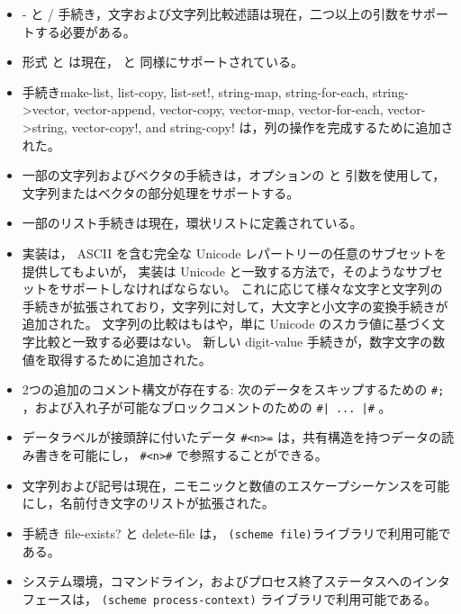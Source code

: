 \begin{itemize}
\item {\cf -} と {\cf /} 手続き，文字および文字列比較述語は現在，二つ以上の引数をサポートする必要がある。

\item 形式 \sharptrue{} と \sharpfalse{} は現在， \schtrue{} と \schfalse{} 同様にサポートされている。

\item 手続き{\cf make-list}, {\cf list-copy}, {\cf list-set!},
{\cf string-map}, {\cf string-for-each}, {\cf string->vector}, 
{\cf vector-append},
{\cf vector-copy}, {\cf vector-map}, {\cf vector-for-each}, 
{\cf vector->string}, {\cf vector-copy!}, and {\cf string-copy!}
は，列の操作を完成するために追加された。

\item 一部の文字列およびベクタの手続きは，オプションの  と  引数を使用して，文字列またはベクタの部分処理をサポートする。

\item 一部のリスト手続きは現在，環状リストに定義されている。

\item 実装は， ASCII を含む完全な Unicode レパートリーの任意のサブセットを提供してもよいが，
実装は Unicode と一致する方法で，そのようなサブセットをサポートしなければならない。
これに応じて様々な文字と文字列の手続きが拡張されており，文字列に対して，大文字と小文字の変換手続きが追加された。
文字列の比較はもはや，単に Unicode のスカラ値に基づく文字比較と一致する必要はない。
新しい {\cf digit-value} 手続きが，数字文字の数値を取得するために追加された。

\item 2つの追加のコメント構文が存在する:
次のデータをスキップするための {\tt \#;} ，および入れ子が可能なブロックコメントのための {\tt \#| ... |\#} 。

\item データラベルが接頭辞に付いたデータ {\tt \#<n>=} は，共有構造を持つデータの読み書きを可能にし， {\tt \#<n>\#} で参照することができる。

\item 文字列および記号は現在，ニモニックと数値のエスケープシーケンスを可能にし，名前付き文字のリストが拡張された。

\item 手続き {\cf file-exists?} と {\cf delete-file} は， {\tt (scheme file)}ライブラリで利用可能である。

\item システム環境，コマンドライン，およびプロセス終了ステータスへのインタフェースは， {\tt (scheme process-context)} ライブラリで利用可能である。


\end{itemize}
